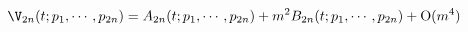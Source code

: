 \begin{equation}
\V_{2n} (t; p_1,\cdots,p_{2n}) = A_{2n} (t; p_1,\cdots,p_{2n}) + m^2 B_{2n}
(t; p_1,\cdots,p_{2n}) + \text{O} (m^4)
\end{equation}


